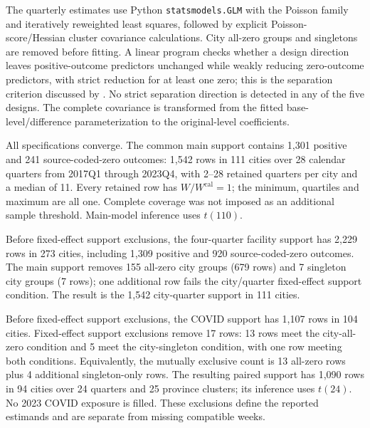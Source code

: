 The quarterly estimates use Python \texttt{statsmodels.GLM} with the Poisson
family and iteratively reweighted least squares, followed by explicit
Poisson-score/Hessian cluster covariance calculations.  City all-zero groups
and singletons are removed before fitting.  A linear program checks whether a
design direction leaves positive-outcome predictors unchanged while weakly
reducing zero-outcome predictors, with strict reduction for at least one zero;
this is the separation criterion discussed by
\citet{correia2026separation}.  No strict separation direction is detected in
any of the five designs.  The complete covariance is transformed from the
fitted base-level/difference parameterization to the original-level
coefficients.

All specifications converge.  The common main support contains 1,301 positive
and 241 source-coded-zero outcomes: 1,542 rows in 111 cities over 28 calendar
quarters from 2017Q1 through 2023Q4, with 2--28 retained quarters per city and
a median of 11.  Every retained row has $W/W^{\mathrm{cal}}=1$; the minimum,
quartiles and maximum are all one.  Complete coverage was not imposed as an
additional sample threshold.  Main-model inference uses $t(110)$.

Before fixed-effect support exclusions, the four-quarter facility support has
2,229 rows in 273 cities, including 1,309 positive and 920 source-coded-zero
outcomes.  The main support removes 155 all-zero city groups (679 rows) and 7
singleton city groups (7 rows); one additional row fails the city/quarter
fixed-effect support condition.  The result is the 1,542 city-quarter support
in 111 cities.

Before fixed-effect support exclusions, the COVID support has 1,107 rows in 104
cities.  Fixed-effect support exclusions remove 17 rows: 13 rows meet the
city-all-zero condition and 5 meet the city-singleton condition, with one row
meeting both conditions.  Equivalently, the mutually exclusive count is 13
all-zero rows plus 4 additional singleton-only rows.  The resulting paired
support has 1,090 rows in 94 cities over 24
quarters and 25 province clusters; its inference uses $t(24)$.  No 2023 COVID
exposure is filled.  These exclusions define the reported estimands and are
separate from missing compatible weeks.
